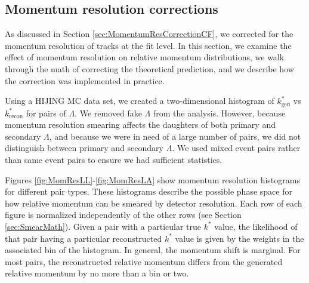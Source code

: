\subsection{Momentum resolution corrections}
\label{sec:MomResCorrectFit}

As discussed in Section \ref{sec:MomentumResCorrectionCF}, we corrected for the momentum resolution of tracks at the fit level. 
In this section, we examine the effect of momentum resolution on relative momentum distributions, we walk through the math of correcting the theoretical prediction, and we describe how the correction was implemented in practice.

Using a HIJING MC data set, we created a two-dimensional histogram of $k^*_\mathrm{gen}$ vs $k^*_\mathrm{recon}$ for pairs of $\Lambda$.
We removed fake $\Lambda$ from the analysis.
However, because momentum resolution smearing affects the daughters of both primary and secondary $\Lambda$, and because we were in need of a large number of pairs, we did not distinguish between primary and secondary $\Lambda$.
We used mixed event pairs rather than same event pairs to ensure we had sufficient statistics.

Figures \ref{fig:MomResLL}-\ref{fig:MomResLA} show momentum resolution histograms for different pair types. 
These histograms describe the possible phase space for how relative momentum can be smeared by detector resolution.
Each row of each figure is normalized independently of the other rows (see Section \ref{sec:SmearMath}).
Given a pair with a particular true $k^*$ value, the likelihood of that pair having a particular reconstructed $k^*$ value is given by the weights in the associated bin of the histogram.
In general, the momentum shift is marginal.
For most pairs, the reconstructed relative momentum differs from the generated relative momentum by no more than a bin or two.

